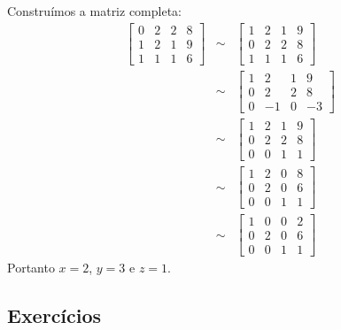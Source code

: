 \begin{resol}
Construímos a matriz completa:
\begin{eqnarray*}\left[
\begin{array}{ccc|c}
0 &2& 2&8\\
1 &2& 1&9\\
1 & 1 &1&6
\end{array}
\right] &\sim&
\left[
\begin{array}{ccc|c}
1 &2& 1&9\\
0 &2& 2&8\\
1 & 1 &1&6
\end{array}
\right] \\ 
&\sim&
\left[
\begin{array}{ccc|c}
1 &2& 1&9\\
0 &2& 2&8\\
0 & -1 &0&-3
\end{array}
\right]\\
&\sim&
\left[
\begin{array}{ccc|c}
1 &2& 1&9\\
0 &2& 2&8\\
0 & 0 &1&1
\end{array}
\right]\\
&\sim&
\left[
\begin{array}{ccc|c}
1 &2& 0&8\\
0 &2& 0&6\\
0 & 0 &1&1
\end{array}
\right]\\
&\sim&
\left[
\begin{array}{ccc|c}
1 &0& 0&2\\
0 &2& 0&6\\
0 & 0 &1&1
\end{array}
\right]
\end{eqnarray*}
Portanto $x=2$, $y=3$ e $z=1$.
\end{resol}


\subsection*{Exercícios}

